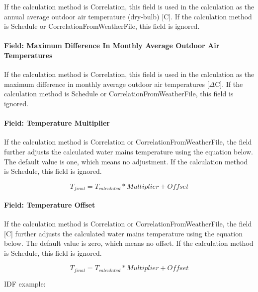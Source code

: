 If the calculation method is Correlation, this field is used in the calculation as the annual average outdoor air temperature (dry-bulb) {[}C{]}. If the calculation method is Schedule or CorrelationFromWeatherFile, this field is ignored.

\paragraph{Field: Maximum Difference In Monthly Average Outdoor Air Temperatures}\label{field-maximum-difference-in-monthly-average-outdoor-air-temperatures}

If the calculation method is Correlation, this field is used in the calculation as the maximum difference in monthly average outdoor air temperatures {[}\(\Delta\)C{]}. If the calculation method is Schedule or CorrelationFromWeatherFile, this field is ignored.

\paragraph{Field: Temperature Multiplier}\label{field-temperature-multiplier}

If the calculation method is Correlation or CorrelationFromWeatherFile, the field further adjusts the calculated water mains temperature using the equation below. The default value is one, which means no adjustment. If the calculation method is Schedule, this field is ignored.

\begin{equation}
{T_{final}} = {T_{calculated}} * {Multiplier} + {Offset}
\end{equation}

\paragraph{Field: Temperature Offset}\label{field-temperature-offset}

If the calculation method is Correlation or CorrelationFromWeatherFile, the field {[}C{]} further adjusts the calculated water mains temperature using the equation below. The default value is zero, which means no offset. If the calculation method is Schedule, this field is ignored.

\begin{equation}
{T_{final}} = {T_{calculated}} * {Multiplier} + {Offset}
\end{equation}

IDF example:

